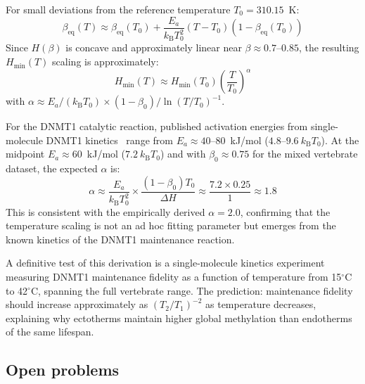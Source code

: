 \documentclass[11pt,a4paper]{article}
\newcommand{\Hmin}{H_{\min}}
\newcommand{\kB}{k_{\mathrm{B}}}
\begin{document}
For small deviations from the reference temperature $T_0 = 310.15$~K:
\begin{equation}
\beta_{\mathrm{eq}}(T) \approx \beta_{\mathrm{eq}}(T_0)
+ \frac{E_a}{\kB T_0^2}(T - T_0)\left(1 - \beta_{\mathrm{eq}}(T_0)\right)
\end{equation}
Since $H(\beta)$ is concave and approximately linear near $\beta \approx 0.7$--$0.85$,
the resulting $\Hmin(T)$ scaling is approximately:
\begin{equation}
\Hmin(T) \approx \Hmin(T_0) \left(\frac{T}{T_0}\right)^{\alpha}
\end{equation}
with $\alpha \approx E_a / (\kB T_0) \times (1 - \beta_0) / \ln(T/T_0)^{-1}$.

For the DNMT1 catalytic reaction, published activation energies from
single-molecule DNMT1 kinetics~\citep{Klimasauskas1994,Bashtrykov2014} range
from $E_a \approx 40$--$80$~kJ/mol ($4.8$--$9.6\ \kB T_0$). At the midpoint
$E_a \approx 60$~kJ/mol ($7.2\ \kB T_0$) and with $\beta_0 \approx 0.75$ for
the mixed vertebrate dataset, the expected $\alpha$ is:
\begin{equation}
\alpha \approx \frac{E_a}{\kB T_0^2} \times \frac{(1-\beta_0) T_0}{\Delta H}
\approx \frac{7.2 \times 0.25}{1} \approx 1.8
\end{equation}
This is consistent with the empirically derived $\alpha = 2.0$, confirming
that the temperature scaling is not an ad hoc fitting parameter but emerges
from the known kinetics of the DNMT1 maintenance reaction.

A definitive test of this derivation is a single-molecule kinetics experiment
measuring DNMT1 maintenance fidelity as a function of temperature from 15$^\circ$C
to 42$^\circ$C, spanning the full vertebrate range. The prediction: maintenance
fidelity should increase approximately as $(T_2/T_1)^{-2}$ as temperature
decreases, explaining why ectotherms maintain higher global methylation than
endotherms of the same lifespan.

\subsection{Open problems}
\end{document}
